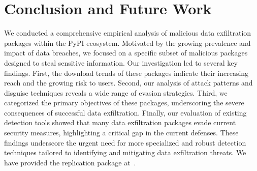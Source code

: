 
\section{Conclusion and Future Work}

We conducted a comprehensive empirical analysis of malicious data exfiltration packages within the PyPI ecosystem. Motivated by the growing prevalence and impact of data breaches, we focused on a specific subset of malicious packages designed to steal sensitive information. Our investigation led to several key findings. First, the download trends of these packages indicate their increasing reach and the growing risk to users. Second, our analysis of attack patterns and disguise techniques reveals a wide range of evasion strategies. Third, we categorized the primary objectives of these packages, underscoring the severe consequences of successful data exfiltration. Finally, our evaluation of existing detection tools showed that many data exfiltration packages evade current security measures, highlighting a critical gap in the current defenses. These findings underscore the urgent need for more specialized and robust detection techniques tailored to identifying and mitigating data exfiltration threats. We have provided the replication package at~\cite{replication}.